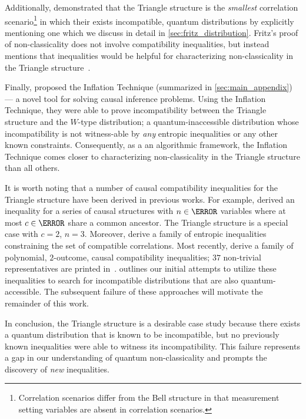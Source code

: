\documentclass[aps, 10pt, english, twoside, pra, nofootinbib, tightenlines, longbibliography, superscriptaddress]{revtex4-1}
\begin{document}
    Additionally, \citet{Fritz_2012} demonstrated that the Triangle structure is the \textit{smallest} correlation scenario\footnote{Correlation scenarios differ from the Bell structure in that measurement setting variables are absent in correlation scenarios.} in which their exists incompatible, quantum distributions by explicitly mentioning one which we discuss in detail in \cref{sec:fritz_distribution}. Fritz's proof of non-classicality does not involve compatibility inequalities, but instead mentions that inequalities would be helpful for characterizing non-classicality in the Triangle structure~\cite{Fritz_2012}.

    Finally, \citet{Inflation} proposed the Inflation Technique (summarized in \cref{sec:main_appendix}) --- a novel tool for solving causal inference problems. Using the Inflation Technique, they were able to prove incompatibility between the Triangle structure and the $W$-type distribution; a quantum-inaccessible distribution whose incompatibility is not witness-able by \textit{any} entropic inequalities or any other known constraints. Consequently, as a an algorithmic framework, the Inflation Technique comes closer to characterizing non-classicality in the Triangle structure than all others.

    It is worth noting that a number of causal compatibility inequalities for the Triangle structure have been derived in previous works. For example, \citet{Steudel_2010} derived an inequality for a series of causal structures with $n \in \N$ variables where at most $c \in \N$ share a common ancestor. The Triangle structure is a special case with $c = 2$, $n = 3$. Moreover, \citet{Henson_2014} derive a family of entropic inequalities constraining the set of compatible correlations. Most recently, \citet{Inflation} derive a family of polynomial, $2$-outcome, causal compatibility inequalities; $37$ non-trivial representatives are printed in~\cite{Inflation}.  outlines our initial attempts to utilize these inequalities to search for incompatible distributions that are also quantum-accessible. The subsequent failure of these approaches will motivate the remainder of this work.

    In conclusion, the Triangle structure is a desirable case study because there exists a quantum distribution that is known to be incompatible, but no previously known inequalities were able to witness its incompatibility. This failure represents a gap in our understanding of quantum non-classicality and prompts the discovery of \textit{new} inequalities.
\end{document}
